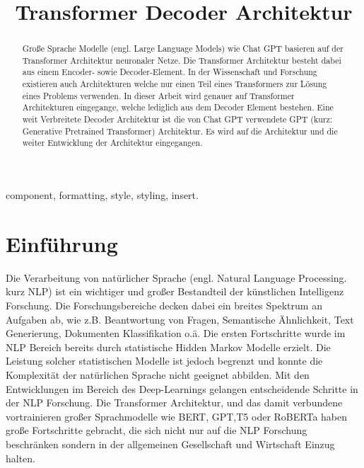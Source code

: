 \documentclass[conference]{IEEEtran}
\begin{document}
\title{Transformer Decoder Architektur}

\author{

}

\maketitle




\begin{abstract}
Große Sprache Modelle (engl. Large Language Models) wie Chat GPT basieren auf der Transformer Architektur neuronaler Netze. Die Transformer Architektur besteht dabei aus einem Encoder- sowie Decoder-Element. In der Wissenschaft und Forschung existieren auch Architekturen welche nur einen Teil eines Transformers zur Lösung eines Problems verwenden. In dieser Arbeit wird genauer auf Transformer Architekturen eingegange, welche lediglich aus dem Decoder Element bestehen. Eine weit Verbreitete Decoder Architektur ist die von Chat GPT verwendete GPT (kurz: Generative Pretrained Transformer) Architektur. Es wird auf die Architektur und die weiter Entwicklung der Architektur eingegangen.
\end{abstract}

\begin{IEEEkeywords}
component, formatting, style, styling, insert.
\end{IEEEkeywords}

\section{Einführung}
Die Verarbeitung von natürlicher Sprache (engl. Natural Language Processing. kurz NLP) ist ein wichtiger und großer Bestandteil der künstlichen Intelligenz Forschung. Die Forschungsbereiche decken dabei ein breites Spektrum an Aufgaben ab, wie z.B. Beantwortung von Fragen, Semantische Ähnlichkeit, Text Generierung, Dokumenten Klassifikation o.ä. Die ersten Fortschritte wurde im NLP Bereich bereits durch statistische Hidden Markov Modelle erzielt. Die Leistung solcher statistischen Modelle ist jedoch begrenzt und konnte die Komplexität der natürlichen Sprache nicht geeignet abbilden. Mit den Entwicklungen im Bereich des Deep-Learnings gelangen entscheidende Schritte in der NLP Forschung. Die Transformer Architektur, und das damit verbundene vortrainieren großer Sprachmodelle wie BERT, GPT,T5 oder RoBERTa haben große Fortschritte gebracht, die sich nicht nur auf die NLP Forschung beschränken sondern in der allgemeinen Gesellschaft und Wirtschaft Einzug halten.
\end{document}

